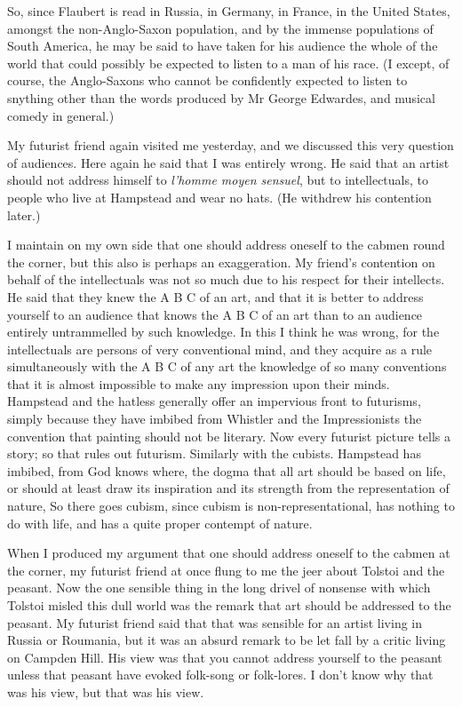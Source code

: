 So, since Flaubert is read in Russia, in Germany, in France, in the
United States, amongst the non-Anglo-Saxon population, and by the
immense populations of South America, he may be said to have taken for
his audience the whole of the world that could possibly be expected to
listen to a man of his race. (I except, of course, the Anglo-Saxons who
cannot be confidently expected to listen to snything other than the
words produced by Mr George Edwardes, and musical comedy in general.)

My futurist friend again visited me yesterday, and we discussed this
very question of audiences. Here again he said that I was entirely
wrong. He said that an artist should not address himself to
\emph{l'homme moyen sensuel}, but to intellectuals, to people who live
at Hampstead and wear no hats. (He withdrew his contention later.)

I maintain on my own side that one should address oneself to the cabmen
round the corner, but this also is perhaps an exaggeration. My friend's
contention on behalf of the intellectuals was not so much due to his
respect for their intellects. He said that they knew the A B C of an
art, and that it is better to address yourself to an audience that knows
the A B C of an art than to an audience entirely untrammelled by such
knowledge. In this I think he was wrong, for the intellectuals are
persons of very conventional mind, and they acquire as a rule
simultaneously with the A B C of any art the knowledge of so many
conventions that it is almost impossible to make any impression upon
their minds. Hampstead and the hatless generally offer an impervious
front to futurisms, simply because they have imbibed from Whistler and
the Impressionists the convention that painting should not be literary.
Now every futurist picture tells a story; so that rules out futurism.
Similarly with the cubists. Hampstead has imbibed, from God knows where,
the dogma that all art should be based on life, or should at least draw
its inspiration and its strength from the representation of nature, So
there goes cubism, since cubism is non-representational, has nothing to
do with life, and has a quite proper contempt of nature.

When I produced my argument that one should address oneself to the
cabmen at the corner, my futurist friend at once flung to me the jeer
about Tolstoi and the peasant. Now the one sensible thing in the long
drivel of nonsense with which Tolstoi misled this dull world was the
remark that art should be addressed to the peasant. My futurist friend
said that that was sensible for an artist living in Russia or Roumania,
but it was an absurd remark to be let fall by a critic living on Campden
Hill. His view was that you cannot address yourself to the peasant
unless that peasant have evoked folk-song or folk-lores. I don't know
why that was his view, but that was his view.

